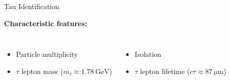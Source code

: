 \documentclass[11pt, xcolor={dvipsnames}, aspectratio=169]{beamer}
\begin{document}
\begin{frame}{Tau Identification}
  \vspace{1em}

  \textbf{Characteristic features:}%

  \begin{columns}[onlytextwidth]

    \begin{itemize}
    \item Particle multiplicity
    \item $\tau$ lepton mass ($m_\tau \approx \SI{1.78}{\GeV}$)
    \end{itemize}



    \begin{itemize}
    \item Isolation
    \item $\tau$ lepton lifetime ($c\tau \approx \SI{87}{\micro\meter}$)
    \end{itemize}
  \end{columns}
\end{frame}


\end{document}
